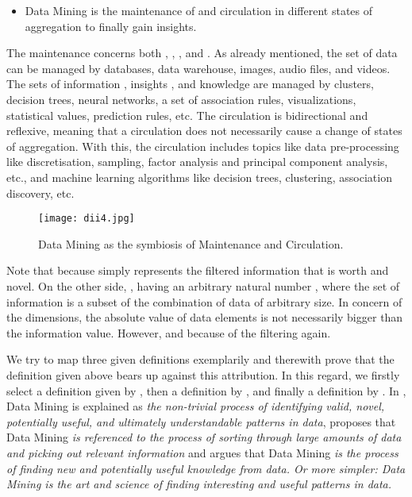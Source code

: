 \documentclass[10pt,latex8]{article}
\begin{document}
\begin{itemize}
    \item Data Mining is the maintenance of and circulation in different states of aggregation to finally gain insights.
\end{itemize}

The maintenance concerns both , , , and . As already mentioned, the set of data  can be managed by databases, data warehouse, images, audio files, and videos. The sets of information , insights , and knowledge  are managed by clusters, decision trees, neural networks, a set of association rules, visualizations, statistical values, prediction rules, etc. The circulation is bidirectional and reflexive, meaning that a circulation does not necessarily cause a change of states of aggregation. With this, the circulation includes topics like data pre-processing like discretisation, sampling, factor analysis and principal component analysis, etc., and machine learning algorithms like decision trees, clustering, association discovery, etc.

\begin{figure}[htbp]
   \centering
   \texttt{[image: dii4.jpg]} 
   \caption{Data Mining as the symbiosis of Maintenance and Circulation.}
   \label{fig:dii4}
\end{figure}

Note that  because  simply represents the filtered information that is worth and novel. On the other side, , having an arbitrary natural number , where the set of information is a subset of the combination of data of arbitrary size. In concern of the dimensions, the absolute value of data elements is not necessarily bigger than the information value. However,  and  because of the filtering again.

We try to map three given definitions exemplarily and therewith prove that the definition given above bears up against this attribution. In this regard, we firstly select a definition given by \cite{fayyad}, then a definition by \cite{wikipedia}, and finally a definition by \cite{kdnuggets}. In \cite{fayyad}, Data Mining is explained as \textit{the non-trivial process of identifying valid, novel, potentially useful, and ultimately understandable patterns in data}, \cite{wikipedia} proposes that Data Mining \textit{is referenced to the process of sorting through large amounts of data and picking out relevant information} and \cite{kdnuggets} argues that Data Mining \textit{is the process of finding new and potentially useful knowledge from data. Or more simpler: Data Mining is the art and science of finding interesting and useful patterns in data.}
\end{document}
